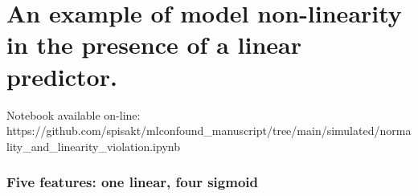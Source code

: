 \hypertarget{an-example-of-model-non-linearity-in-the-presence-of-a-linear-predictor.}{%
\section{An example of model non-linearity in the presence of a linear
predictor.}\label{an-example-of-model-non-linearity-in-the-presence-of-a-linear-predictor.}}

Notebook available on-line:
https://github.com/spisakt/mlconfound\_manuscript/tree/main/simulated/normality\_and\_linearity\_violation.ipynb

\begin{Shaded}
\begin{Highlighting}[]
\OperatorTok{=}\NormalTok{\{}\NormalTok{:(}\NormalTok{, }\NormalTok{)\})}
\NormalTok{)}
\end{Highlighting}
\end{Shaded}

\hypertarget{five-features-one-linear-four-sigmoid}{%
\subsubsection{Five features: one linear, four
sigmoid}\label{five-features-one-linear-four-sigmoid}}

\begin{Shaded}
\begin{Highlighting}[]
\OperatorTok{=}
\OperatorTok{=}
\OperatorTok{=}\NormalTok{)}
\OperatorTok{=}
\OperatorTok{=}\OperatorTok{-}\OperatorTok{/}

\OperatorTok{=}
 \NormalTok{(}\NormalTok{,}\NormalTok{):}
\OperatorTok{=}\OperatorTok{*}\NormalTok{)}

\OperatorTok{=}\OperatorTok{+}\NormalTok{,}

 \NormalTok{(}\NormalTok{):}
\OperatorTok{=}\OperatorTok{=}
\OperatorTok{=}\OperatorTok{=}
\end{Highlighting}
\end{Shaded}

